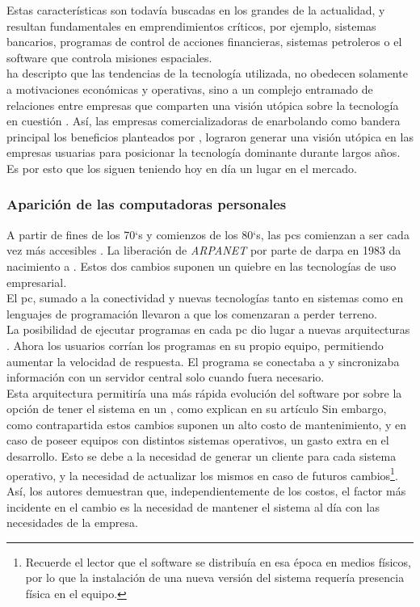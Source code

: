 Estas características son todavía buscadas en los grandes \mainframes de la actualidad,
y resultan fundamentales en emprendimientos críticos, por ejemplo, sistemas bancarios,
programas de control de acciones financieras, sistemas petroleros o el software que
controla misiones espaciales.\\
 ha descripto que las tendencias de la
tecnología utilizada, no obedecen solamente a motivaciones económicas y operativas, sino
a un complejo entramado de relaciones entre empresas que comparten una visión utópica
sobre la tecnología en cuestión . Así, las empresas
comercializadoras de \mainframes enarbolando como bandera principal los beneficios
planteados por \citeauthor{Stephens:2008:BOOK}, lograron generar una visión utópica en
las empresas usuarias para posicionar la tecnología dominante durante largos años.
Es por esto que los \mainframes siguen teniendo hoy en día un lugar en el mercado.\\
 
\subsubsection{Aparición de las computadoras personales}
\label{subsubsec:intro:about_web:pc_era}

A partir de fines de los 70`s y comienzos de los 80`s, las \acp{pc}
comienzan a ser cada vez más accesibles .
La liberación de \emph{ARPANET} por parte de \acs{darpa} en 1983 da nacimiento
a \internet. Estos dos cambios suponen un quiebre en las tecnologías de uso
empresarial.\\
El \ac{pc}, sumado a la conectividad y nuevas tecnologías tanto en sistemas como en
lenguajes de programación llevaron a que los \mainframes comenzaran a perder terreno.\\
La posibilidad de ejecutar programas en cada \ac{pc} dio lugar a nuevas arquitecturas
\clientserver. Ahora los usuarios corrían los programas en su propio equipo, permitiendo
aumentar la velocidad de respuesta. El programa se conectaba a \internet y sincronizaba
información con un servidor central solo cuando fuera necesario.\\
Esta arquitectura permitiría una más rápida evolución del software por sobre la opción de
tener el sistema en un \mainframe, como explican 
en su artículo \period Sin embargo, como contrapartida  estos
cambios suponen un alto costo de mantenimiento, y en caso de poseer equipos con distintos
sistemas operativos, un gasto extra en el desarrollo. Esto se debe a la necesidad de
generar un cliente para cada sistema operativo, y la necesidad de actualizar los mismos
en caso de futuros cambios\footnote{
	Recuerde el lector que el software se distribuía en esa época en medios físicos, por
	lo que la instalación de una nueva versión del sistema requería presencia física en el
	equipo.
}.
Así, los autores demuestran que, independientemente de los costos, el factor más incidente
en el cambio es la necesidad de mantener el sistema al día con las necesidades de la empresa.

